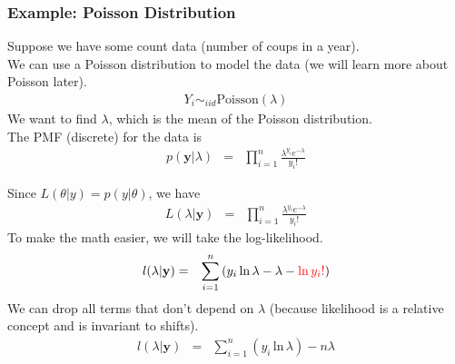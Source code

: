 \documentclass{beamer}
\begin{document}
\begin{frame}
\frametitle{Example: Poisson Distribution}
Suppose we have some count data (number of coups in a year). \\
\pause 
\bigskip
We can use a Poisson distribution to model the data (we will learn more about
Poisson later).
\pause
\begin{eqnarray*}
Y_i \sim_{iid} \mathrm{Poisson}(\lambda)
\end{eqnarray*}
\pause
We want to find $\lambda$, which is the mean of the Poisson
distribution.\\ \pause 
\bigskip
The PMF (discrete) for the data is
\begin{eqnarray*}
p(\mathbf{y} | \lambda) &=& \prod_{i=1}^n \frac{\lambda^{y_i} e^{-\lambda}}{y_i!}
\end{eqnarray*}
\end{frame}

\begin{frame}
Since $L(\theta | y) = p(y | \theta)$, we have
\begin{eqnarray*}
L(\lambda | \mathbf{y}) &=& \prod_{i=1}^n \frac{\lambda^{y_i} e^{-\lambda}}{y_i!}
\end{eqnarray*}
\pause
To make the math easier, we will take the log-likelihood.
\pause
\begin{eqnarray*}
l(\lambda | \mathbf{y}) &=& \sum_{i=1}^n \left( y_i \, \mathrm{ln} \, \lambda
- \lambda - \textcolor{red}{\mathrm{ln} \, y_i!} \right)
\end{eqnarray*}
\pause
We can drop all terms that don't depend on $\lambda$ (because
likelihood is a relative concept and is invariant to shifts).
\pause
\begin{eqnarray*}
l(\lambda | \mathbf{y}) &=& \sum_{i=1}^n (y_i \, \mathrm{ln} \, \lambda)
- n\lambda 
\end{eqnarray*}
\end{frame}
\end{document}
